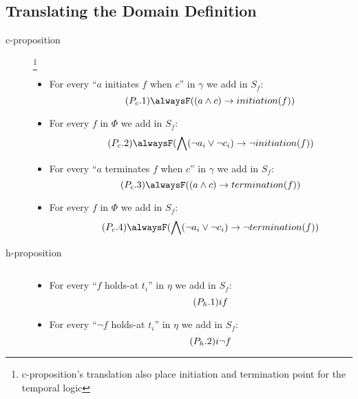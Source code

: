 \subsection{Translating the Domain Definition}\label{sec:trans_def_ltl}

\begin{description}
  \item[c-proposition]\footnote{c-proposition's translation also place initiation and termination point for the temporal logic}
  \begin{itemize}
    \item For every “$a$ initiates $f$ when $c$” in $\gamma$ we add in $S_f$:
    \begin{equation}\tag{$P_c.1$}
      \alwaysF((a\land c)\rightarrow initiation(f))
    \end{equation}
    \item For every $f$ in $\Phi$ we add in $S_f$:
    \begin{equation}\tag{$P_c.2$}
      \alwaysF(\bigwedge(\neg a_i\lor \neg c_i)\rightarrow \neg initiation(f))
    \end{equation}
    \item For every “$a$ terminates $f$ when $c$” in $\gamma$ we add in $S_f$:
    \begin{equation}\tag{$P_c.3$}
      \alwaysF((a\land c)\rightarrow termination(f))
    \end{equation}
    \item For every $f$ in $\Phi$ we add in $S_f$:
    \begin{equation}\tag{$P_c.4$}
      \alwaysF(\bigwedge(\neg a_i\lor \neg c_i)\rightarrow \neg termination(f))
    \end{equation}
  \end{itemize}
  \item[h-proposition] $ $
  \begin{itemize}
    \item For every “$f$ holds-at $t_i$” in $\eta$ we add in $S_f$:
    \begin{equation}\tag{$P_h.1$}
      \next^{i}f
    \end{equation}
    \item For every “$\neg f$ holds-at $t_i$” in $\eta$ we add in $S_f$:
    \begin{equation}\tag{$P_h.2$}
      \next^{i} \neg f

\end{equation}
\end{itemize}
\end{description}
